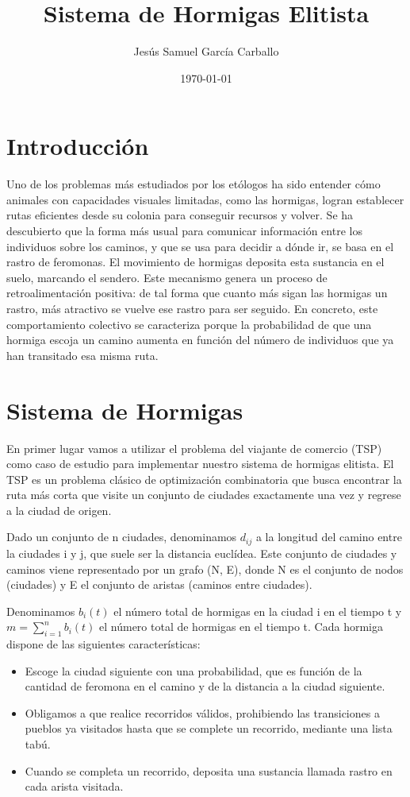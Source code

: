\documentclass{article}
\title{Sistema de Hormigas Elitista}
\author{Jesús Samuel García Carballo}
\date{\today}
\begin{document}
\maketitle

\section{Introducción}

Uno de los problemas más estudiados por los etólogos ha sido entender cómo animales con capacidades visuales
limitadas, como las hormigas, logran establecer rutas eficientes desde su colonia para conseguir recursos y volver.
Se ha descubierto que la forma más usual para comunicar información entre los individuos sobre los caminos, 
y que se usa para decidir a dónde ir, se basa en el rastro de feromonas.
El movimiento de hormigas deposita esta sustancia en el suelo, marcando el sendero.
Este mecanismo genera un proceso de retroalimentación positiva: de tal forma que cuanto más sigan las hormigas 
un rastro, más atractivo se vuelve ese rastro para ser seguido. 
En concreto, este comportamiento colectivo se caracteriza porque la probabilidad de que una hormiga escoja 
un camino aumenta en función del número de individuos que ya han transitado esa misma ruta.

\section{Sistema de Hormigas}

En primer lugar vamos a utilizar el problema del viajante de comercio (TSP) como caso de estudio para
implementar nuestro sistema de hormigas elitista. 
El TSP es un problema clásico de optimización combinatoria que busca encontrar la ruta más corta 
que visite un conjunto de ciudades exactamente una vez y regrese a la ciudad de origen.

Dado un conjunto de n ciudades, denominamos $d_{ij}$ a la longitud del camino entre la ciudades i y j,
que suele ser la distancia euclídea. Este conjunto de ciudades y caminos viene representado por un grafo (N, E),
donde N es el conjunto de nodos (ciudades) y E el conjunto de aristas (caminos entre ciudades).

Denominamos $b_i(t)$ el número total de hormigas en la ciudad i en el tiempo t y $m = \sum_{i=1}^{n} b_i(t)$ 
el número total de hormigas en el tiempo t.
Cada hormiga dispone de las siguientes características:
\begin{itemize}
    \item Escoge la ciudad siguiente con una probabilidad, que es función de la cantidad de feromona en el camino y de la distancia a la ciudad siguiente.
    \item Obligamos a que realice recorridos válidos, prohibiendo las transiciones a pueblos ya visitados hasta que se complete un recorrido, mediante una lista tabú.
    \item Cuando se completa un recorrido, deposita una sustancia llamada rastro en cada arista visitada.
\end{itemize}
\end{document}
